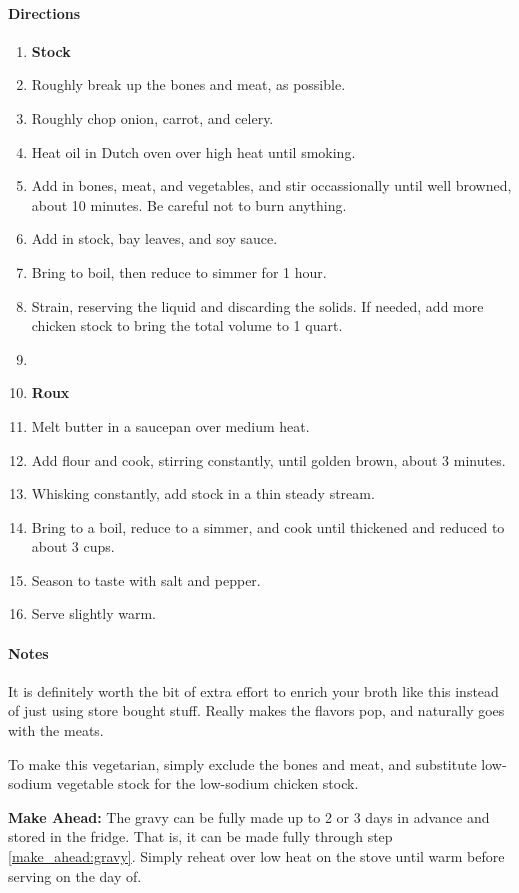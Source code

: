 \documentclass[12pt]{article}
\newenvironment*{directions}
	{
		\paragraph*{Directions}
		\begin{enumerate}
	}
	{
		\end{enumerate}
	}
\newenvironment*{notes}
	{
		\paragraph*{Notes}
		\begin{adjustwidth}{1cm}{}
	}
	{
		\end{adjustwidth}
	}
\begin{document}
	\begin{directions}
		\item[] \textbf{Stock}
		\item Roughly break up the bones and meat, as possible.
		\item Roughly chop onion, carrot, and celery.
		\item Heat oil in Dutch oven over high heat until smoking.
		\item Add in bones, meat, and vegetables, and stir occassionally until well browned, about 10 minutes. Be careful not to burn anything.
		\item Add in stock, bay leaves, and soy sauce.
		\item Bring to boil, then reduce to simmer for 1 hour.
		\item Strain, reserving the liquid and discarding the solids. If needed, add more chicken stock to bring the total volume to 1 quart.
		\item[] \hfill
		\item[] \textbf{Roux}
		\item Melt butter in a saucepan over medium heat.
		\item Add flour and cook, stirring constantly, until golden brown, about 3 minutes.
		\item Whisking constantly, add stock in a thin steady stream.
		\item Bring to a boil, reduce to a simmer, and cook until thickened and reduced to about 3 cups.
		\item Season to taste with salt and pepper. \label{make_ahead:gravy}
		\item Serve slightly warm.
	\end{directions}
	
	\begin{notes}
		It is definitely worth the bit of extra effort to enrich your broth like this instead of just using store bought stuff. Really makes the flavors pop, and naturally goes with the meats.
		
		To make this vegetarian, simply exclude the bones and meat, and substitute low-sodium vegetable stock for the low-sodium chicken stock.
		
		\textbf{Make Ahead:} The gravy can be fully made up to 2 or 3 days in advance and stored in the fridge. That is, it can be made fully through step \ref{make_ahead:gravy}. Simply reheat over low heat on the stove until warm before serving on the day of.
	\end{notes}
	
\end{document}
